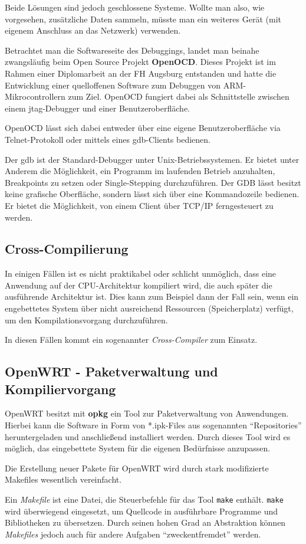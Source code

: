 Beide Lösungen sind jedoch geschlossene Systeme. Wollte man also, wie
vorgesehen, zusätzliche Daten sammeln, müsste man ein weiteres Gerät (mit
eigenem Anschluss an das Netzwerk) verwenden.

Betrachtet man die Softwareseite des Debuggings, landet man beinahe
zwangsläufig beim Open Source Projekt \textbf{OpenOCD}. Dieses Projekt ist im
Rahmen einer Diplomarbeit\cite{OOCD2} an der FH Augsburg entstanden und hatte
die Entwicklung einer quelloffenen Software zum Debuggen von
ARM-Mikrocontrollern zum Ziel. OpenOCD fungiert dabei als Schnittstelle zwischen
einem \gls{jtag}-Debugger und einer Benutzeroberfläche.

OpenOCD lässt sich dabei entweder über eine eigene Benutzeroberfläche via
Telnet-Protokoll oder mittels eines \gls{gdb}-Clients bedienen.
\begin{definition}[GDB]
Der \gls{gdb} ist der Standard-Debugger unter
Unix-Betriebssystemen. Er bietet unter Anderem die Möglichkeit, ein Programm im
laufenden Betrieb anzuhalten, Breakpoints zu setzen oder Single-Stepping
durchzuführen. Der GDB lässt besitzt keine grafische Oberfläche, sondern
lässt sich über eine Kommandozeile bedienen. Er bietet die Möglichkeit, von
einem Client über TCP/IP ferngesteuert zu werden. 
\end{definition}
\subsection{Cross-Compilierung}
In einigen Fällen ist es nicht praktikabel oder schlicht unmöglich, dass eine
Anwendung auf der CPU-Architektur kompiliert wird, die auch später die
ausführende Architektur ist. Dies kann zum Beispiel dann der Fall sein, wenn ein
engebettetes System über nicht ausreichend Ressourcen (Speicherplatz) verfügt,
um den Kompilationsvorgang durchzuführen.

In diesen Fällen kommt ein sogenannter \emph{Cross-Compiler} zum Einsatz.
\subsection{OpenWRT - Paketverwaltung und Kompiliervorgang}
OpenWRT besitzt mit \textbf{opkg} ein Tool zur Paketverwaltung von Anwendungen.
Hierbei kann die Software in Form von *.ipk-Files aus sogenannten "`Repositories"'
heruntergeladen und anschließend installiert werden. Durch dieses Tool wird es
möglich, das eingebettete System für die eigenen Bedürfnisse anzupassen.

Die Erstellung neuer Pakete für OpenWRT wird durch stark modifizierte Makefiles
wesentlich vereinfacht.
 \begin{definition}[Makefile]
Ein \emph{Makefile} ist eine Datei, die Steuerbefehle für das Tool
\texttt{make} enthält. \texttt{make} wird überwiegend eingesetzt, um Quellcode
in ausführbare Programme und Bibliotheken zu übersetzen. Durch seinen hohen
Grad an Abstraktion können \emph{Makefiles} jedoch auch für andere Aufgaben
"`zweckentfremdet"' werden.
\end{definition}

